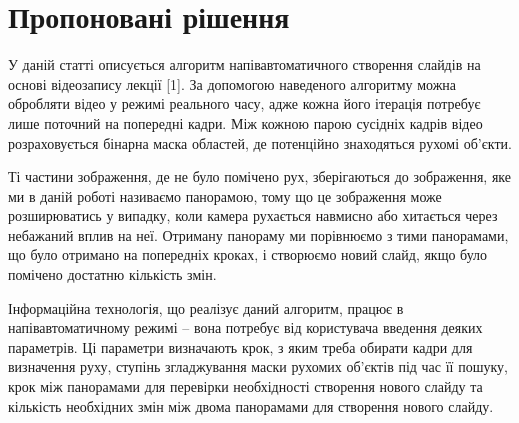 \section{Пропоновані рішення}


У даній статті описується алгоритм напівавтоматичного 
створення слайдів на основі відеозапису лекції [1].
За допомогою наведеного алгоритму можна обробляти відео 
у режимі реального часу, адже кожна його ітерація потребує 
лише поточний на попередні кадри. Між кожною парою 
сусідніх кадрів відео розраховується бінарна маска областей, де 
потенційно знаходяться рухомі об’єкти. 


Ті частини зображення, де не було помічено рух, зберігаються до 
зображення, яке ми в даній роботі називаємо панорамою, тому що 
це зображення може розширюватись у випадку, коли камера рухається 
навмисно або хитається через небажаний вплив на неї. 
Отриману панораму ми порівнюємо з тими панорамами, що було отримано на 
попередніх кроках, і створюємо новий слайд, якщо було помічено 
достатню кількість змін.


Інформаційна технологія, що реалізує даний алгоритм, працює в 
напівавтоматичному режимі – вона потребує від користувача введення 
деяких параметрів. 
Ці параметри визначають крок, з яким треба обирати кадри для визначення руху, 
ступінь згладжування маски рухомих об’єктів під час її пошуку, крок 
між панорамами для перевірки необхідності створення нового 
слайду та кількість необхідних змін між двома панорамами для створення нового слайду.



\usetikzlibrary{arrows,positioning,shapes}
\begin{figure}
\begin{center}
\end{center}
\end{figure}